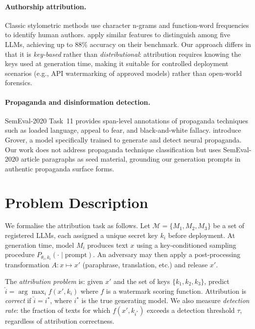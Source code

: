 \documentclass[11pt]{article}
\begin{document}
\paragraph{Authorship attribution.}
Classic stylometric methods \cite{koppel2009computational} use character
n-grams and function-word frequencies to identify human authors.
\citet{uchendu2020authorship} apply similar features to distinguish among
five LLMs, achieving up to 88\% accuracy on their benchmark.
Our approach differs in that it is \emph{key-based} rather than
\emph{distributional}: attribution requires knowing the keys used at
generation time, making it suitable for controlled deployment scenarios
(e.g., API watermarking of approved models) rather than open-world forensics.

\paragraph{Propaganda and disinformation detection.}
SemEval-2020 Task~11 \cite{semeval2020t11} provides span-level annotations
of propaganda techniques such as loaded language, appeal to fear, and
black-and-white fallacy.
\citet{zellers2019grover} introduce Grover, a model specifically trained to
generate and detect neural propaganda.
Our work does not address propaganda technique classification but uses
SemEval-2020 article paragraphs as seed material, grounding our generation
prompts in authentic propaganda surface forms.

\section{Problem Description}
\label{sec:problem}

We formalise the attribution task as follows.
Let $\mathcal{M} = \{M_1, M_2, M_3\}$ be a set of registered LLMs, each
assigned a unique secret key $k_i$ before deployment.
At generation time, model $M_i$ produces text $x$ using a key-conditioned
sampling procedure $P_{\theta_i, k_i}(\cdot \mid \text{prompt})$.
An adversary may then apply a post-processing transformation
$A : x \mapsto x'$ (paraphrase, translation, etc.) and release $x'$.

The \emph{attribution problem} is: given $x'$ and the set of keys
$\{k_1, k_2, k_3\}$, predict $\hat{i} = \arg\max_i f(x', k_i)$ where $f$ is a
watermark scoring function.
Attribution is \emph{correct} if $\hat{i} = i^*$, where $i^*$ is the true
generating model.
We also measure \emph{detection rate}: the fraction of texts for which
$f(x', k_{i^*})$ exceeds a detection threshold $\tau$, regardless of
attribution correctness.
\end{document}
